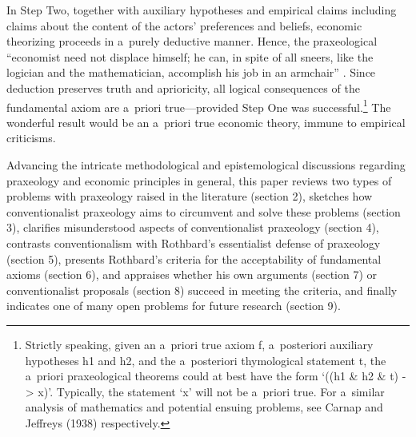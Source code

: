 In Step Two, together with auxiliary hypotheses and empirical claims including claims about the content of the actors' preferences and beliefs, economic theorizing proceeds in a~purely deductive manner. Hence, the praxeological ``economist need not displace himself; he can, in spite of all sneers, like the logician and the mathematician, accomplish his job in an armchair'' 
\parencite[][p.78]{mises_ultimate_2012}. %
 Since deduction preserves truth and aprioricity, all logical consequences of the fundamental axiom are a~priori true---provided Step One was successful.\footnote{Strictly speaking, given an a~priori true axiom f, a~posteriori auxiliary hypotheses h1 and h2, and the a~posteriori thymological statement t, the a~priori praxeological theorems could at best have the form ‘((h1 \& h2 \& t) -{\textgreater} x)'. Typically, the statement ‘x' will not be a~priori true. For a~similar analysis of mathematics and potential ensuing problems, see Carnap 
\parencites*[][]{carnap_foundations_1955}[][]{carnap_untersuchungen_2000} %
 and Jeffreys 
\parencite*[][]{}%
(1938) respectively.} The wonderful result would be an a~priori true economic theory, immune to empirical criticisms.



Advancing the intricate methodological and epistemological discussions regarding praxeology and economic principles in general, this paper reviews two types of problems with praxeology raised in the literature (section 2), sketches how conventionalist praxeology aims to circumvent and solve these problems (section 3), clarifies misunderstood aspects of conventionalist praxeology (section 4), contrasts conventionalism with Rothbard's essentialist defense of praxeology (section 5), presents Rothbard's criteria for the acceptability of fundamental axioms (section 6), and appraises whether his own arguments (section 7) or conventionalist proposals (section 8) succeed in meeting the criteria, and finally indicates one of many open problems for future research (section 9).



